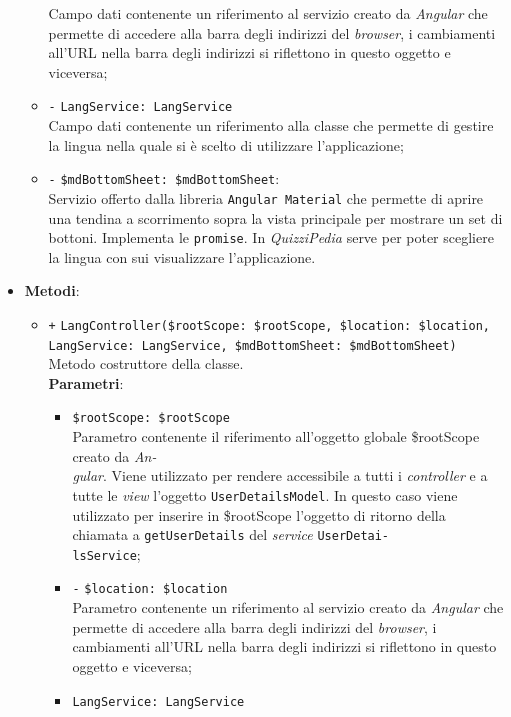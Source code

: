 \begin{itemize}
\begin{itemize}
		Campo dati contenente un riferimento al servizio creato da \textit{Angular} che permette di accedere alla barra degli indirizzi del \textit{browser}, i cambiamenti all'URL nella barra degli indirizzi si riflettono in questo oggetto e viceversa; 
		\item \texttt{-} \texttt{LangService: LangService} \\
		Campo dati contenente un riferimento alla classe che permette di gestire la lingua nella quale si è scelto di utilizzare l'applicazione;
		\item \texttt{-} \texttt{\$mdBottomSheet: \$mdBottomSheet}: \\
		Servizio offerto dalla libreria \texttt{Angular Material} che permette di aprire una tendina a scorrimento sopra la vista principale per mostrare un set di bottoni. Implementa le \texttt{promise}. In \textit{QuizziPedia} serve per poter scegliere la lingua con sui visualizzare l'applicazione.
	\end{itemize}	
		\item \textbf{Metodi}:
		\begin{itemize}
		\item \texttt{+} \texttt{LangController(\$rootScope: \$rootScope, \$location: \$location, LangService: LangService, \$mdBottomSheet: \$mdBottomSheet)} \\ Metodo costruttore della classe.\\
		\textbf{Parametri}: 
		\begin{itemize}
			\item \texttt{\$rootScope: \$rootScope} \\
			Parametro contenente il riferimento all'oggetto globale \$rootScope creato da \textit{An-\\gular{}}. Viene utilizzato per rendere accessibile a tutti i \textit{controller} e a tutte le \textit{view} l'oggetto \texttt{UserDetailsModel}. In questo caso viene utilizzato per inserire in \$rootScope l'oggetto di ritorno della chiamata a \texttt{getUserDetails} del \textit{service} \texttt{UserDetai-\\lsService};
			\item \texttt{-} \texttt{\$location: \$location} \\
			Parametro contenente un riferimento al servizio creato da \textit{Angular} che permette di accedere alla barra degli indirizzi del \textit{browser}, i cambiamenti all'URL nella barra degli indirizzi si riflettono in questo oggetto e viceversa; 
			\item \texttt{LangService: LangService} \\

\end{itemize}
\end{itemize}
\end{itemize}
